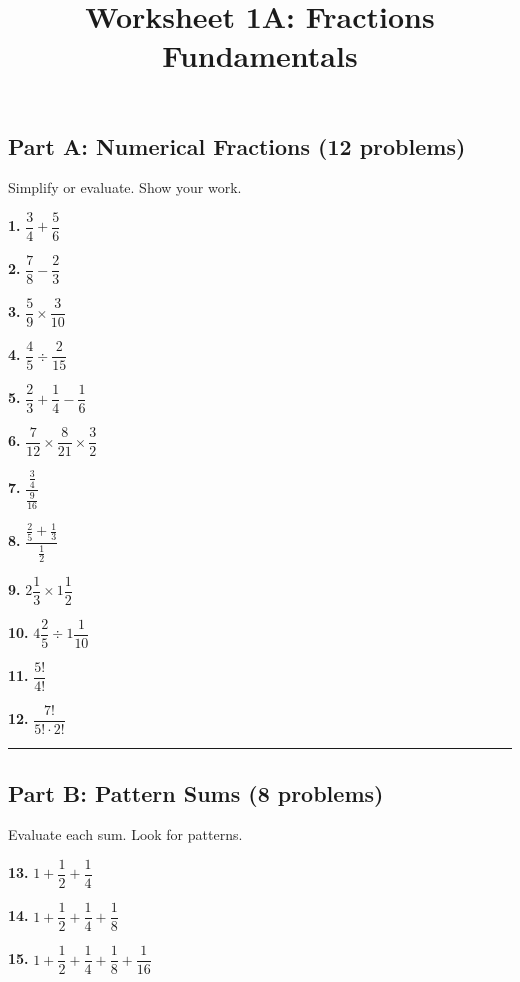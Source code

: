 \documentclass[
  11pt,
]{article}
\title{Worksheet 1A: Fractions Fundamentals}
\author{}
\date{}
\begin{document}
\maketitle

\hypertarget{part-a-numerical-fractions-12-problems}{%
\subsection{Part A: Numerical Fractions (12
problems)}\label{part-a-numerical-fractions-12-problems}}

Simplify or evaluate. Show your work.

\textbf{1.} \(\dfrac{3}{4} + \dfrac{5}{6}\)

\textbf{2.} \(\dfrac{7}{8} - \dfrac{2}{3}\)

\textbf{3.} \(\dfrac{5}{9} \times \dfrac{3}{10}\)

\textbf{4.} \(\dfrac{4}{5} \div \dfrac{2}{15}\)

\textbf{5.} \(\dfrac{2}{3} + \dfrac{1}{4} - \dfrac{1}{6}\)

\textbf{6.} \(\dfrac{7}{12} \times \dfrac{8}{21} \times \dfrac{3}{2}\)

\textbf{7.} \(\dfrac{\frac{3}{4}}{\frac{9}{16}}\)

\textbf{8.} \(\dfrac{\frac{2}{5} + \frac{1}{3}}{\frac{1}{2}}\)

\textbf{9.} \(2\dfrac{1}{3} \times 1\dfrac{1}{2}\)

\textbf{10.} \(4\dfrac{2}{5} \div 1\dfrac{1}{10}\)

\textbf{11.} \(\dfrac{5!}{4!}\)

\textbf{12.} \(\dfrac{7!}{5! \cdot 2!}\)

\begin{center}\rule{0.5\linewidth}{0.5pt}\end{center}

\hypertarget{part-b-pattern-sums-8-problems}{%
\subsection{Part B: Pattern Sums (8
problems)}\label{part-b-pattern-sums-8-problems}}

Evaluate each sum. Look for patterns.

\textbf{13.} \(1 + \dfrac{1}{2} + \dfrac{1}{4}\)

\textbf{14.} \(1 + \dfrac{1}{2} + \dfrac{1}{4} + \dfrac{1}{8}\)

\textbf{15.}
\(1 + \dfrac{1}{2} + \dfrac{1}{4} + \dfrac{1}{8} + \dfrac{1}{16}\)
\end{document}
